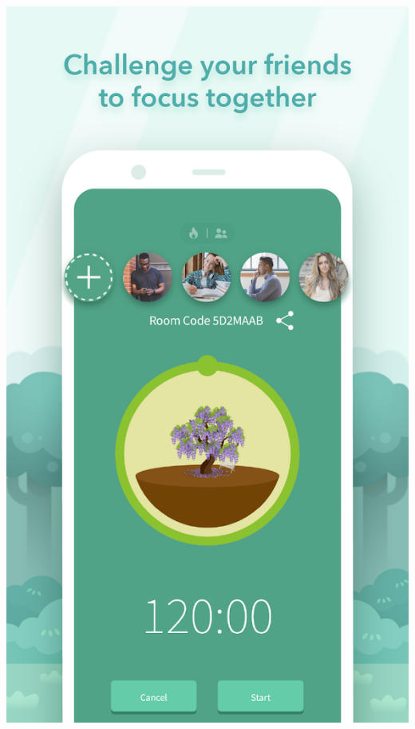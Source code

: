 \documentclass[11pt]{article}
\begin{document}
\begin{itemize}
\begin{center}
\includegraphics[width=.9\linewidth]{./docs/4.png}
\end{center}
\end{itemize}
\end{document}
